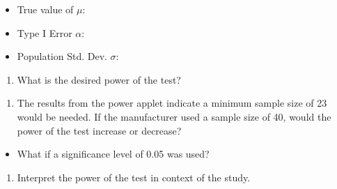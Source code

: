 \documentclass[
]{report}
\providecommand{\tightlist}{%
  \setlength{\itemsep}{0pt}\setlength{\parskip}{0pt}}
\begin{document}
\vspace{0.1in}

\begin{itemize}
\tightlist
\item
  True value of \(\mu\):
\end{itemize}

\vspace{0.1in}

\begin{itemize}
\tightlist
\item
  Type I Error \(\alpha\):
\end{itemize}

\vspace{0.1in}

\begin{itemize}
\tightlist
\item
  Population Std. Dev. \(\sigma\):
\end{itemize}

\begin{enumerate}
\def\labelenumi{\alph{enumi}.}
\setcounter{enumi}{1}
\tightlist
\item
  What is the desired power of the test?
\end{enumerate}

\vspace{2.5in}

\begin{enumerate}
\def\labelenumi{\alph{enumi}.}
\setcounter{enumi}{2}
\tightlist
\item
  The results from the power applet indicate a minimum sample size of 23 would be needed. If the manufacturer used a sample size of 40, would the power of the test increase or decrease?
\end{enumerate}

\vspace{0.2in}

\begin{itemize}
\tightlist
\item
  What if a significance level of 0.05 was used?
\end{itemize}

\vspace{0.2in}

\begin{enumerate}
\def\labelenumi{\alph{enumi}.}
\setcounter{enumi}{3}
\tightlist
\item
  Interpret the power of the test in context of the study.
  \newpage
\end{enumerate}
\end{document}
